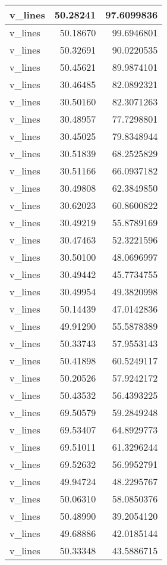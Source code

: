 \documentclass[
]{book}
\theoremstyle{definition}
\theoremstyle{definition}
\theoremstyle{definition}
\theoremstyle{definition}
\theoremstyle{remark}
\begin{document}
\begin{tabular}{l|r|r}
\hline
v\_lines & 50.28241 & 97.6099836\\
\hline
v\_lines & 50.18670 & 99.6946801\\
\hline
v\_lines & 50.32691 & 90.0220535\\
\hline
v\_lines & 50.45621 & 89.9874101\\
\hline
v\_lines & 30.46485 & 82.0892321\\
\hline
v\_lines & 30.50160 & 82.3071263\\
\hline
v\_lines & 30.48957 & 77.7298801\\
\hline
v\_lines & 30.45025 & 79.8348944\\
\hline
v\_lines & 30.51839 & 68.2525829\\
\hline
v\_lines & 30.51166 & 66.0937182\\
\hline
v\_lines & 30.49808 & 62.3849850\\
\hline
v\_lines & 30.62023 & 60.8600822\\
\hline
v\_lines & 30.49219 & 55.8789169\\
\hline
v\_lines & 30.47463 & 52.3221596\\
\hline
v\_lines & 30.50100 & 48.0696997\\
\hline
v\_lines & 30.49442 & 45.7734755\\
\hline
v\_lines & 30.49954 & 49.3820998\\
\hline
v\_lines & 50.14439 & 47.0142836\\
\hline
v\_lines & 49.91290 & 55.5878389\\
\hline
v\_lines & 50.33743 & 57.9553143\\
\hline
v\_lines & 50.41898 & 60.5249117\\
\hline
v\_lines & 50.20526 & 57.9242172\\
\hline
v\_lines & 50.43532 & 56.4393225\\
\hline
v\_lines & 69.50579 & 59.2849248\\
\hline
v\_lines & 69.53407 & 64.8929773\\
\hline
v\_lines & 69.51011 & 61.3296244\\
\hline
v\_lines & 69.52632 & 56.9952791\\
\hline
v\_lines & 49.94724 & 48.2295767\\
\hline
v\_lines & 50.06310 & 58.0850376\\
\hline
v\_lines & 50.48990 & 39.2054120\\
\hline
v\_lines & 49.68886 & 42.0185144\\
\hline
v\_lines & 50.33348 & 43.5886715\\

\end{tabular}
\end{document}
